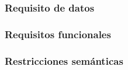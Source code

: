 \subsubsection{Requisito de datos}

\subsubsection{Requisitos funcionales}

\subsubsection{Restricciones semánticas}